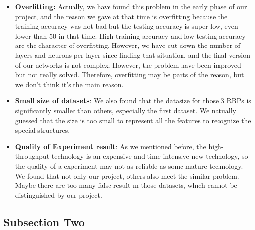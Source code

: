 \documentclass[twoside,twocolumn]{article}
\begin{document}
\begin{itemize}
    \item \textbf{Overfitting:} Actually, we have found this problem in the early phase of our project, and the reason we gave at that time is overfitting because the training accuracy was not bad but the testing accuracy is super low, even lower than 50 in that time. High training accuracy and low testing accuracy are the character of overfitting. However, we have cut down the number of layers and neurons per layer since finding that situation, and the final version of our networks is not complex. However, the problem have been improved but not really solved. Therefore, overfitting may be parts of the reason, but we don't think it's the main reason.
    \item \textbf{Small size of datasets}: We also found that the datasize for those 3 RBPs is significantly smaller than others, especially the first dataset. We natually guessed that the size is too small to represent all the features to recognize the special structures.
    \item \textbf{Quality of Experiment result}: As we mentioned before, the high-throughput technology is an expensive and time-intensive new technology, so the quality of a experiment may not as reliable as some mature technology. We found that not only our project, others also meet the similar problem. Maybe there are too many false result in those datasets, which cannot be distinguished by our project.
\end{itemize}

\subsection{Subsection Two}

\blindtext %

\end{document}
